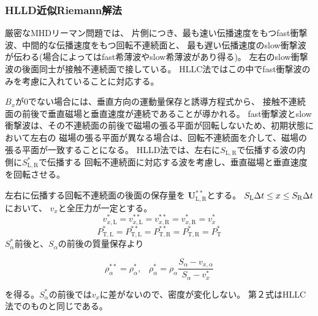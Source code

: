 \clearpage
\subsubsection{HLLD近似Riemann解法}

厳密なMHDリーマン問題では、
片側につき、最も速い伝播速度をもつfast衝撃波、中間的な伝播速度をもつ回転不連続面と、
最も遅い伝播速度のslow衝撃波が伝わる(場合によってはfast希薄波やslow希薄波があり得る)。
左右のslow衝撃波の後面同士が接触不連続面で接している。
HLLC法ではこの中でfast衝撃波のみを考慮に入れていることに対応する。

$B_x$が0でない場合には、垂直方向の運動量保存と誘導方程式から、
接触不連続面の前後で垂直磁場と垂直速度が連続であることが導かれる。
fast衝撃波とslow衝撃波は、その不連続面の前後で磁場の張る平面が回転しないため、初期状態において左右の
磁場の張る平面が異なる場合は、回転不連続面を介して、磁場の張る平面が一致することになる。
HLLD法では、左右に$S_\mathrm{L,R}$で伝播する波の内側に$S_\mathrm{L,R}^*$で伝播する
回転不連続面に対応する波を考慮し、垂直磁場と垂直速度を回転させる。

左右に伝播する回転不連続面の後面の保存量を
$\bm{ U}^{**}_\mathrm{L,R}$とする。
$S_\mathrm{L}\Delta t\le x\le S_\mathrm{R}\Delta t$において、
$v_x$と全圧力が一定とする。
\begin{equation}
    v^*_{x,\mathrm{L}} = v^{**}_{x,\mathrm{L}}
     = v^{**}_{x,\mathrm{R}}
     = v^{*}_{x,\mathrm{R}} = v^*_x
\end{equation}
\begin{equation}
    P^*_{\mathrm{T,L}} = P^{**}_{\mathrm{T,L}}
     = P^{**}_{\mathrm{T,R}}
     = P^{*}_{\mathrm{T,R}} = P^*_\mathrm{T}
\end{equation}
$S^*_\alpha$前後と、$S_\alpha$の前後の質量保存より
\begin{screen}
\begin{equation}
 \rho^{**}_\alpha = \rho^*_\alpha, \;\;\;
 \rho^*_\alpha  = 
 \rho_\alpha \frac{S_\alpha - v_{x,\alpha}}{S_\alpha - v^*_x} 
 \label{hlld_mhd_mass}
\end{equation}
\end{screen}
を得る。$S_\alpha^*$の前後では$v_x$に差がないので、密度が変化しない。
第２式はHLLC法でのものと同じである。

